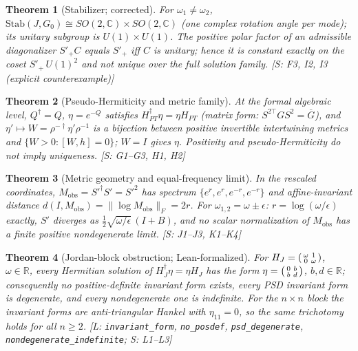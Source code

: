 \documentclass{article}
\newtheorem{theorem}{Theorem}
\newcommand{\w}{\omega}
\begin{document}
\begin{theorem}[Stabilizer; corrected]\label{thm:stab}
For $\w_1\ne\w_2$, $\mathrm{Stab}(J,G_0)\cong SO(2,\mathbb C)\times SO(2,\mathbb C)$
(one complex rotation angle per mode); its unitary subgroup is $U(1)\times U(1)$.
The positive polar factor of an admissible diagonalizer $S'_+C$ equals $S'_+$
iff $C$ is unitary; hence it is constant exactly on the coset $S'_+\,U(1)^2$
and \emph{not} unique over the full solution family.
{\rm [S: F3, I2, I3 (explicit counterexample)]}
\end{theorem}

\begin{theorem}[Pseudo-Hermiticity and metric family]\label{thm:metric}
At the formal algebraic level, $Q^\dagger=Q$, $\eta=e^{-Q}$ satisfies
$H_{PT}^\dagger\eta=\eta H_{PT}$ (matrix form: $S^{2\top}GS^2=\overline G$),
and $\eta'\mapsto W=\rho^{-\dagger}\eta'\rho^{-1}$ is a bijection between
positive invertible intertwining metrics and $\{W>0:[W,h]=0\}$; $W=I$ gives
$\eta$. Positivity and pseudo-Hermiticity do not imply uniqueness.
{\rm [S: G1--G3, H1, H2]}
\end{theorem}

\begin{theorem}[Metric geometry and equal-frequency limit]\label{thm:geom}
In the rescaled coordinates, $M_{\mathrm{obs}}=S'^\dagger S'=S'^2$ has spectrum
$\{e^r,e^r,e^{-r},e^{-r}\}$ and affine-invariant distance
$d(I,M_{\mathrm{obs}})=\|\log M_{\mathrm{obs}}\|_F=2r$. For
$\w_{1,2}=\w\pm\epsilon$: $r=\log(\w/\epsilon)$ exactly, $S'$ diverges as
$\tfrac12\sqrt{\w/\epsilon}\,(I+B)$, and no scalar normalization of
$M_{\mathrm{obs}}$ has a finite positive nondegenerate limit.
{\rm [S: J1--J3, K1--K4]}
\end{theorem}

\begin{theorem}[Jordan-block obstruction; Lean-formalized]\label{thm:jordan}
For $H_J=\begin{psmallmatrix}\w&1\\0&\w\end{psmallmatrix}$, $\w\in\mathbb R$,
every Hermitian solution of $H_J^\dagger\eta=\eta H_J$ has the form
$\eta=\begin{psmallmatrix}0&b\\ b&d\end{psmallmatrix}$, $b,d\in\mathbb R$;
consequently no positive-definite invariant form exists, every PSD invariant
form is degenerate, and every nondegenerate one is indefinite. For the
$n\times n$ block the invariant forms are anti-triangular Hankel with
$\eta_{11}=0$, so the same trichotomy holds for all $n\ge2$.
{\rm [L: \texttt{invariant\_form}, \texttt{no\_posdef}, \texttt{psd\_degenerate},
\texttt{nondegenerate\_indefinite}; S: L1--L3]}
\end{theorem}
\end{document}
